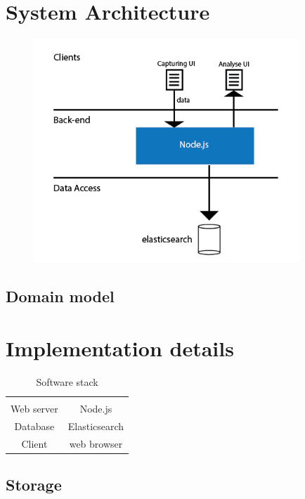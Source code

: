 

\section{System Architecture}

\begin{figure}[ht!]
\centering
\includegraphics[width=100mm]{images/general/arhitecture.png}
\caption{}
\label{overflow}
\end{figure}



\subsection{Domain model}


\section{Implementation details}

\begin{table}[ht]
\caption{Software stack}
\begin{center}
\begin{tabular}{c|c}
    \hline
    \multicolumn{2}{c}{}\\
    Web server& Node.js\\
    Database& Elasticsearch\\
    Client & web  browser \\
\hline
\end{tabular}
\end{center}
\label{tab:multicol}
\end{table}


\subsection{Storage}

